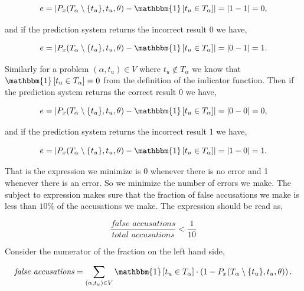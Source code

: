 \begin{equation}
    e = \left|
        P_x(T_\alpha \setminus \{t_u\}, t_u, \theta) -
        \mathbbm{1}\left[t_u \in T_\alpha\right]
    \right| = |1 - 1| = 0,
\end{equation}

and if the prediction system returns the incorrect result 0 we have,

\begin{equation}
    e = \left|
        P_x(T_\alpha \setminus \{t_u\}, t_u, \theta) -
        \mathbbm{1}\left[t_u \in T_\alpha\right]
    \right| = |0 - 1| = 1.
\end{equation}

Similarly for a problem $(\alpha, t_u) \in V$ where $t_u \notin T_\alpha$ we
know that $\mathbbm{1}\left[t_u \in T_\alpha\right] = 0$ from the definition of
the indicator function. Then if the prediction system returns the correct result
0 we have,

\begin{equation}
    e = \left|
        P_x(T_\alpha \setminus \{t_u\}, t_u, \theta) -
        \mathbbm{1}\left[t_u \in T_\alpha\right]
    \right| = |0 - 0| = 0, \end{equation}

and if the prediction system returns the incorrect result 1 we have,

\begin{equation}
    e = \left|
        P_x(T_\alpha \setminus \{t_u\}, t_u, \theta) -
        \mathbbm{1}\left[t_u \in T_\alpha\right]
    \right| = |1 - 0| = 1.
\end{equation}

That is the expression we minimize is 0 whenever there is no error and 1
whenever there is an error. So we minimize the number of errors we make. The
subject to expression makes sure that the fraction of false accusations we make
is less than $10\%$ of the accusations we make. The expression should be read
as,

\begin{equation}
    \frac{\textit{false accusations}}{\textit{total accusations}} < \frac{1}{10}
\end{equation}

Consider the numerator of the fraction on the left hand side,

\begin{equation}
    \textit{false accusations} = \sum_{(\alpha, t_u) \in V}
    \mathbbm{1}\left[t_u \in T_\alpha\right] \cdot
    \left(1 - P_x(T_\alpha \setminus \{t_u\}, t_u, \theta)\right).
\end{equation}

